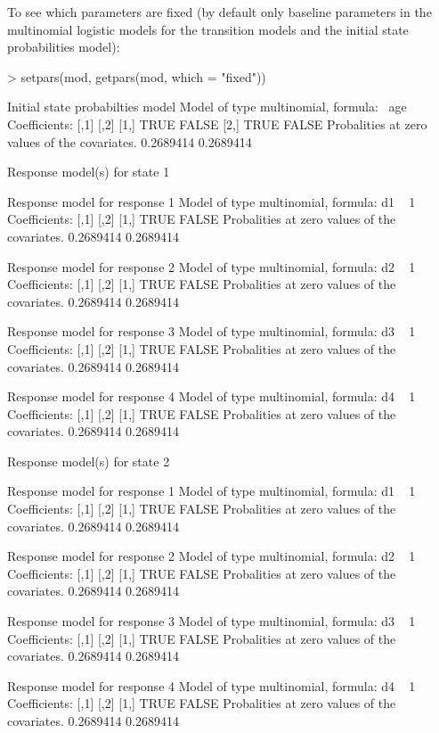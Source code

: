 \documentclass[article]{jss}
\begin{document}
To see which parameters are fixed (by default only baseline parameters
in the multinomial logistic models for the transition models and the
initial state probabilities model):
\begin{Schunk}
\begin{Sinput}
> setpars(mod, getpars(mod, which = "fixed"))
\end{Sinput}
\begin{Soutput}
Initial state probabilties model 
Model of type multinomial, formula: ~age
Coefficients: 
     [,1]  [,2]
[1,] TRUE FALSE
[2,] TRUE FALSE
Probalities at zero values of the covariates.
0.2689414 0.2689414 

Response model(s) for state 1 

Response model for response 1 
Model of type multinomial, formula: d1 ~ 1
Coefficients: 
     [,1]  [,2]
[1,] TRUE FALSE
Probalities at zero values of the covariates.
0.2689414 0.2689414 

Response model for response 2 
Model of type multinomial, formula: d2 ~ 1
Coefficients: 
     [,1]  [,2]
[1,] TRUE FALSE
Probalities at zero values of the covariates.
0.2689414 0.2689414 

Response model for response 3 
Model of type multinomial, formula: d3 ~ 1
Coefficients: 
     [,1]  [,2]
[1,] TRUE FALSE
Probalities at zero values of the covariates.
0.2689414 0.2689414 

Response model for response 4 
Model of type multinomial, formula: d4 ~ 1
Coefficients: 
     [,1]  [,2]
[1,] TRUE FALSE
Probalities at zero values of the covariates.
0.2689414 0.2689414 


Response model(s) for state 2 

Response model for response 1 
Model of type multinomial, formula: d1 ~ 1
Coefficients: 
     [,1]  [,2]
[1,] TRUE FALSE
Probalities at zero values of the covariates.
0.2689414 0.2689414 

Response model for response 2 
Model of type multinomial, formula: d2 ~ 1
Coefficients: 
     [,1]  [,2]
[1,] TRUE FALSE
Probalities at zero values of the covariates.
0.2689414 0.2689414 

Response model for response 3 
Model of type multinomial, formula: d3 ~ 1
Coefficients: 
     [,1]  [,2]
[1,] TRUE FALSE
Probalities at zero values of the covariates.
0.2689414 0.2689414 

Response model for response 4 
Model of type multinomial, formula: d4 ~ 1
Coefficients: 
     [,1]  [,2]
[1,] TRUE FALSE
Probalities at zero values of the covariates.
0.2689414 0.2689414 
\end{Soutput}
\end{Schunk}
\end{document}
